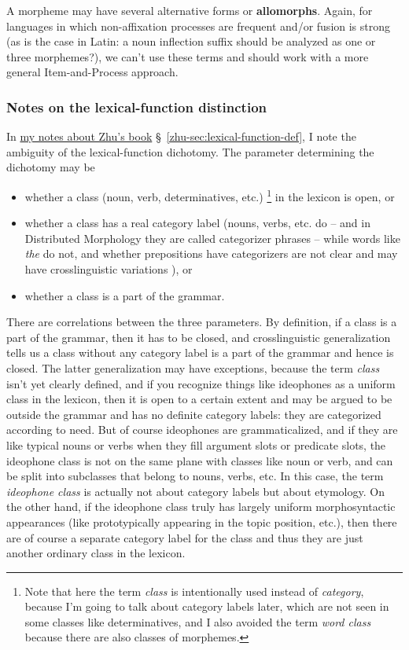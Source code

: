 \documentclass[UTF8, a4paper, oneside, scheme=plain]{ctexart}
\newcommand*{\citesec}[1]{\S~{#1}}
\newcommand*{\concept}[1]{\textbf{#1}}
\newcommand*{\term}[1]{\emph{#1}}
\newcommand*{\corpus}[1]{\emph{#1}}
\newcommand{\zhudexi}{\href{../Chinese/reading-note-zhudexi.pdf}{my notes about Zhu's book}}
\begin{document}
A morpheme may have several alternative forms or \concept{allomorphs}. 
Again, for languages in which non-affixation processes are frequent and/or fusion is strong 
(as is the case in Latin: a noun inflection suffix should be analyzed as one or three morphemes?), 
we can't use these terms and should work with a more general Item-and-Process approach.

\subsubsection{Notes on the lexical-function distinction}\label{sec:lexical-function-distinction}

In \zhudexi{} \citesec{\ref{zhu-sec:lexical-function-def}},
I note the ambiguity of the lexical-function dichotomy.
The parameter determining the dichotomy may be  
\begin{itemize}
    \item whether a class (noun, verb, determinatives, etc.)%
    \footnote{
        Note that here the term \term{class} is intentionally used instead of \term{category}, 
        because I'm going to talk about category labels later, 
        which are not seen in some classes like determinatives,
        and I also avoided the term \term{word class} because there are also classes of morphemes.
    }
    in the lexicon is open, or 
    \item whether a class has a real category label
    (nouns, verbs, etc. do -- and in Distributed Morphology they are called categorizer phrases -- 
    while words like \corpus{the} do not, and
    whether prepositions have categorizers are not clear
    and may have crosslinguistic variations \citep{deacon2014adpositions}), or 
    \item whether a class is a part of the grammar.
\end{itemize}
There are correlations between the three parameters.
By definition, if a class is a part of the grammar,
then it has to be closed,
and crosslinguistic generalization tells us 
a class without any category label is a part of the grammar 
and hence is closed.
The latter generalization may have exceptions,
because the term \term{class} isn't yet clearly defined,
and if you recognize things like ideophones as a uniform class in the lexicon,
then it is open to a certain extent 
and may be argued to be outside the grammar and has no definite category labels:
they are categorized according to need.
But of course ideophones are grammaticalized,
and if they are like typical nouns or verbs when they fill argument slots or predicate slots,
the ideophone class is not on the same plane with classes like noun or verb,
and can be split into subclasses that belong to nouns, verbs, etc.
In this case, the term \term{ideophone class} 
is actually not about category labels but about etymology.
On the other hand,
if the ideophone class truly has largely uniform morphosyntactic appearances
(like prototypically appearing in the topic position, etc.),
then there are of course a separate category label for the class 
and thus they are just another ordinary class in the lexicon.
\end{document}
